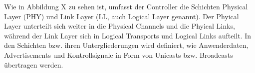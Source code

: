 Wie in Abbildung X
zu sehen ist, umfasst der Controller die Schichten Physical Layer (PHY) und Link Layer (LL, auch Logical Layer genannt). Der Phyical Layer unterteilt sich weiter in die Physical Channels und die Phyical Links, während der Link Layer sich in Logical Transports und Logical Links aufteilt. In den Schichten bzw. ihren Untergliederungen wird definiert, wie Anwenderdaten, Advertisements und Kontrollsignale in Form von Unicasts bzw. Broadcasts übertragen werden.



